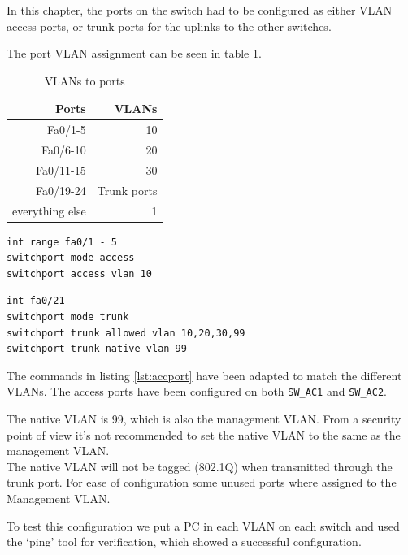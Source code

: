 In this chapter, the ports on the switch had to be configured as either VLAN access ports, or trunk ports for the uplinks to the other switches.

The port VLAN assignment can be seen in table \ref{tab:vlan_ports}.

\begin{table}[h]
\centering
\begin{tabular}{r||r}
\textbf{Ports} & \textbf{VLANs}  \\

		\hline
Fa0/1-5 & 10 \\
Fa0/6-10 & 20 \\
Fa0/11-15 & 30    \\
Fa0/19-24 & Trunk ports  \\
everything else & 1

\end{tabular}
\caption{VLANs to ports}
\label{tab:vlan_ports}
\end{table}

\begin{lstlisting}[caption={Access port configuration},label={lst:accport},language={}]
int range fa0/1 - 5
switchport mode access
switchport access vlan 10
\end{lstlisting}

\begin{lstlisting}[caption={Trunk port configuration},label={lst:accport},language={}]
int fa0/21
switchport mode trunk
switchport trunk allowed vlan 10,20,30,99
switchport trunk native vlan 99
\end{lstlisting}

The commands in listing \ref{lst:accport} have been adapted to match the different VLANs.
The access ports have been configured on both \texttt{SW\_AC1} and \texttt{SW\_AC2}.

The native VLAN is 99, which is also the management VLAN. From a security point of view it's not recommended to set the native VLAN to the same as the management VLAN. \\ 
The native VLAN will not be tagged (802.1Q) when transmitted through the trunk port. For ease of configuration some unused ports where assigned to the Management VLAN.

To test this configuration we put a PC in each VLAN on each switch and used the `ping' tool for verification, which showed a successful configuration.

